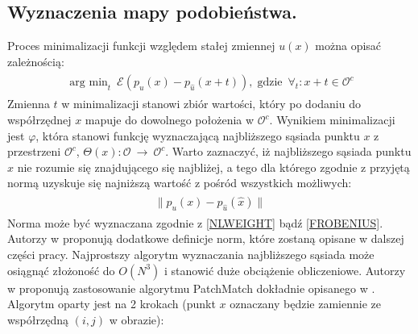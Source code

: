 \documentclass[12pt, twoside, openany]{report}
\theoremstyle{definition}
\begin{document}
\subsection{Wyznaczenia mapy podobieństwa.}
Proces minimalizacji funkcji względem stałej zmiennej $u(x)$ można opisać zależnością:
\begin{align}
\begin{aligned}
\mathop{\operatorname{arg \ min}}_{t} \ \mathcal{E}\left( p_{u}(x) - p_{\hat{u}}(x+t)\right),\operatorname{gdzie} \ \forall_t : x+t \in \mathcal{O}^c
\label{minNNF}
\end{aligned}
\end{align}
Zmienna $t$ w minimalizacji stanowi zbiór wartości, który po dodaniu do współrzędnej $x$ mapuje do dowolnego położenia w $\mathcal{O}^c$. Wynikiem minimalizacji jest $\varphi$, która stanowi funkcję wyznaczającą najbliższego sąsiada punktu $x$ z przestrzeni $\mathcal{O}^c$, $\Theta(x) :\mathcal{O} \ \rightarrow \ \mathcal{O}^c$. Warto zaznaczyć, iż najbliższego sąsiada punktu $x$ nie rozumie się znajdującego się najbliżej, a tego dla którego zgodnie z przyjętą normą uzyskuje się najniższą wartość z pośród wszystkich możliwych:
\begin{align}
\begin{aligned}
\big\| p_{u}(x) - p_{\hat{u}}(\hat{x}) \big\| 
\label{normNNF}
\end{aligned}
\end{align}
Norma może być wyznaczana zgodnie z \eqref{NLWEIGHT} bądź \eqref{FROBENIUS}. Autorzy w \cite{MathematicalModelsforNLTextureInpainting} proponują dodatkowe definicje norm, które zostaną opisane w dalszej części pracy. Najprostszy algorytm wyznaczania najbliższego sąsiada może osiągnąć złożoność do $O(N^3)$ i stanowić duże obciążenie obliczeniowe. Autorzy w \cite{arias2011variational} proponują zastosowanie algorytmu PatchMatch dokładnie opisanego w \cite{barnes2009patchmatch}. Algorytm oparty jest na 2 krokach (punkt $x$ oznaczany będzie zamiennie ze współrzędną $(i, j)$ w obrazie):
\end{document}
